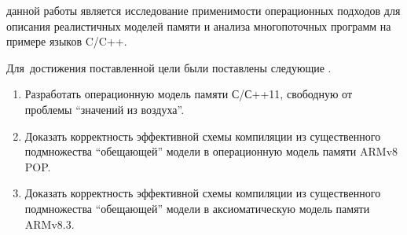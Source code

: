 



{\aim} данной работы является исследование применимости операционных
подходов для описания реалистичных моделей памяти и анализа
многопоточных программ на примере языков C/C++.

Для~достижения поставленной цели были поставлены следующие {\tasks}.
\begin{enumerate}
  \item Разработать операционную модель памяти С/С++11, свободную от проблемы ``значений из воздуха''.
  \item Доказать корректность эффективной схемы компиляции из существенного подмножества ``обещающей'' модели в операционную модель памяти ARMv8 POP.
  \item Доказать корректность эффективной схемы компиляции из существенного подмножества ``обещающей'' модели в аксиоматическую модель памяти ARMv8.3.
\end{enumerate}

